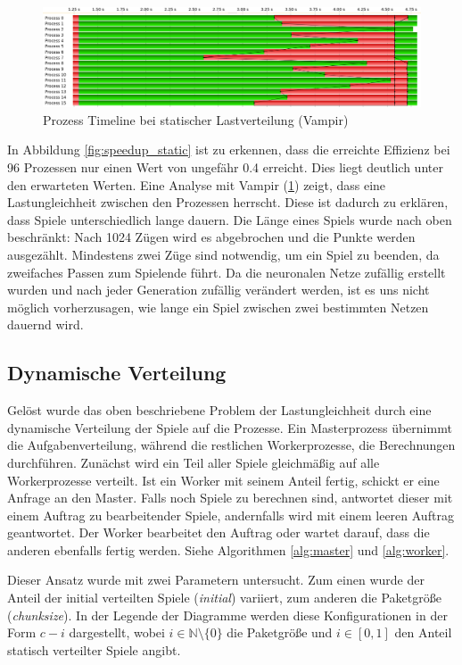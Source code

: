 \begin{figure}
    \centering
    \includegraphics[width=\textwidth]
        {content/img/vampir_static.png}
        \caption{Prozess Timeline bei statischer Lastverteilung (Vampir)}
    \label{fig:vampir_static}
\end{figure}

In Abbildung \ref{fig:speedup_static} ist zu erkennen, dass die erreichte
Effizienz bei 96 Prozessen nur einen Wert von ungefähr \num{0,4} erreicht.
Dies liegt deutlich unter den erwarteten Werten. Eine Analyse mit Vampir
(\ref{fig:vampir_static}) zeigt, dass eine Lastungleichheit zwischen den
Prozessen herrscht. Diese ist dadurch zu erklären, dass Spiele unterschiedlich
lange dauern. Die Länge eines Spiels wurde nach oben beschränkt: Nach 1024
Zügen wird es abgebrochen und die Punkte werden ausgezählt. Mindestens zwei
Züge sind notwendig, um ein Spiel zu beenden, da zweifaches Passen zum
Spielende führt.
Da die neuronalen Netze zufällig erstellt wurden und nach jeder Generation
zufällig verändert werden, ist es uns nicht möglich vorherzusagen, wie lange ein
Spiel zwischen zwei bestimmten Netzen dauernd wird.

\subsection{Dynamische Verteilung}

Gelöst wurde das oben beschriebene Problem der Lastungleichheit durch eine
dynamische Verteilung der Spiele auf die Prozesse.  Ein Masterprozess übernimmt
die Aufgabenverteilung, während die restlichen Workerprozesse, die Berechnungen
durchführen.  Zunächst wird ein Teil aller Spiele gleichmäßig auf alle
Workerprozesse verteilt. Ist ein Worker mit seinem Anteil fertig, schickt er
eine Anfrage an den Master. Falls noch Spiele zu berechnen sind, antwortet
dieser mit einem Auftrag zu bearbeitender Spiele, andernfalls wird mit einem
leeren Auftrag geantwortet.  Der Worker bearbeitet den Auftrag oder wartet
darauf, dass die anderen ebenfalls fertig werden.  Siehe Algorithmen
\ref{alg:master} und \ref{alg:worker}.

Dieser Ansatz wurde mit zwei Parametern untersucht. Zum
einen wurde der Anteil der initial verteilten Spiele (\emph{initial}) variiert,
zum anderen die Paketgröße (\emph{chunksize}). In der Legende der Diagramme
werden diese Konfigurationen in der Form $c-i$ dargestellt, wobei $i \in
\mathbb{N} \setminus \{0\}$ die Paketgröße und $i \in [0, 1]$ den Anteil
statisch verteilter Spiele angibt.

